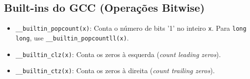 \subsection{Built-ins do GCC (Operações Bitwise)}
\begin{itemize}
    \item \texttt{\_\_builtin\_popcount(x)}: Conta o número de bits '1' no inteiro \texttt{x}. Para \texttt{long long}, use \texttt{\_\_builtin\_popcountll(x)}.
    \item \texttt{\_\_builtin\_clz(x)}: Conta os zeros à esquerda (\textit{count leading zeros}).
    \item \texttt{\_\_builtin\_ctz(x)}: Conta os zeros à direita (\textit{count trailing zeros}). 
\end{itemize}